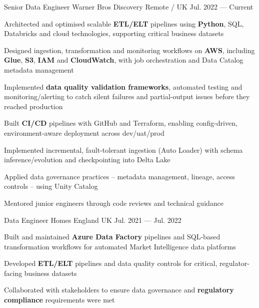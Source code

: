 
\begin{cventries}

  \cventry
  {Senior Data Engineer} %
  {Warner Bros Discovery} %
  {Remote / UK} %
  {Jul. 2022 --- Current} %
  {
    \begin{cvitems}
    \item {Architected and optimised scalable \textbf{ETL/ELT} pipelines using \textbf{Python}, SQL, Databricks and cloud technologies, supporting critical business datasets}
    \item {Designed ingestion, transformation and monitoring workflows on \textbf{AWS}, including \textbf{Glue}, \textbf{S3}, \textbf{IAM} and \textbf{CloudWatch}, with job orchestration and Data Catalog metadata management}
    \item {Implemented \textbf{data quality validation frameworks}, automated testing and monitoring/alerting to catch silent failures and partial-output issues before they reached production}
    \item {Built \textbf{CI/CD} pipelines with GitHub and Terraform, enabling config-driven, environment-aware deployment across dev/uat/prod}
    \item {Implemented incremental, fault-tolerant ingestion (Auto Loader) with schema inference/evolution and checkpointing into Delta Lake}
    \item {Applied data governance practices -- metadata management, lineage, access controls -- using Unity Catalog}
    \item {Mentored junior engineers through code reviews and technical guidance}
    \end{cvitems}
  }

  \cventry
  {Data Engineer} %
  {Homes England} %
  {UK} %
  {Jul. 2021 --- Jul. 2022} %
  {
    \begin{cvitems}
    \item {Built and maintained \textbf{Azure Data Factory} pipelines and SQL-based transformation workflows for automated Market Intelligence data platforms}
    \item {Developed \textbf{ETL/ELT} pipelines and data quality controls for critical, regulator-facing business datasets}
    \item {Collaborated with stakeholders to ensure data governance and \textbf{regulatory compliance} requirements were met}
    \end{cvitems}
  }


\end{cventries}
